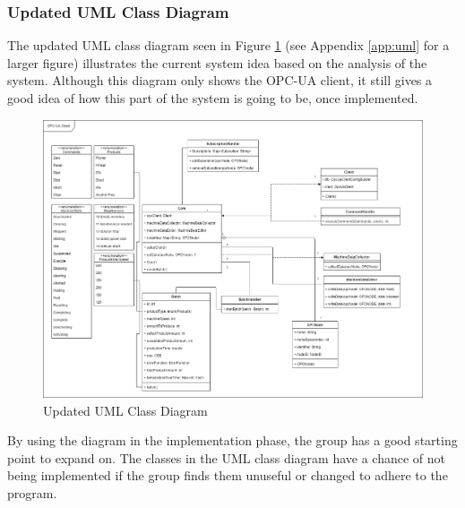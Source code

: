 \subsubsection{Updated UML Class Diagram}
The updated UML class diagram seen in Figure 
\ref{figure:updated_UML_class_diagram} (see Appendix \ref{app:uml} for a larger
figure) illustrates the current system idea based on the analysis of the system.
Although this diagram only shows the OPC-UA client, it still gives a good idea
of how this part of the system is going to be, once implemented.

\begin{figure}[ht]
\centering 
\includegraphics[width=1\textwidth]{images/diagrams/updated_UML_Class_Diagram.drawio.png}
\caption{Updated UML Class Diagram}
\label{figure:updated_UML_class_diagram} 
\end{figure}

By using the diagram in the implementation phase, the group has a good starting 
point to expand on. The classes in the UML class diagram have a chance of not 
being implemented if the group finds them unuseful or changed to adhere to the 
program. 
